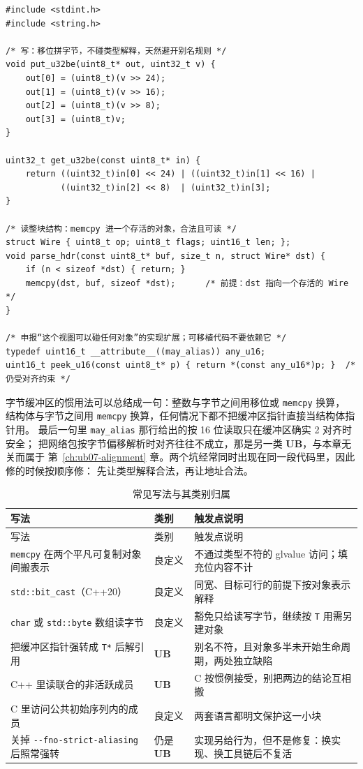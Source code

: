 \documentclass[12pt,a4paper,fontset=fandol]{ctexbook}
\newcommand{\cpp}[1]{C++#1}
\newcommand{\Tp}[1]{\texttt{#1}}
\newcommand{\Opt}[1]{\texttt{-\/-#1}}
\newcommand{\Bk}{\discretionary{}{}{}}
\newcommand{\Lang}[1]{\textsf{#1}}
\newcommand{\CL}{\Lang{C}}
\newcommand{\CPP}{\Lang{C++}}
\newcommand{\UB}{\textbf{\textsf{UB}}}
\newcommand{\Hdr}[1]{\texttt{<#1>}}
\begin{document}
\begin{lstlisting}[style=cstyle, caption={\Hdr{cstdint} 与字节缓冲区：把整数写成字节再解析}]
#include <stdint.h>
#include <string.h>

/* 写：移位拼字节，不碰类型解释，天然避开别名规则 */
void put_u32be(uint8_t* out, uint32_t v) {
    out[0] = (uint8_t)(v >> 24);
    out[1] = (uint8_t)(v >> 16);
    out[2] = (uint8_t)(v >> 8);
    out[3] = (uint8_t)v;
}

uint32_t get_u32be(const uint8_t* in) {
    return ((uint32_t)in[0] << 24) | ((uint32_t)in[1] << 16) |
           ((uint32_t)in[2] << 8)  | (uint32_t)in[3];
}

/* 读整块结构：memcpy 进一个存活的对象，合法且可读 */
struct Wire { uint8_t op; uint8_t flags; uint16_t len; };
void parse_hdr(const uint8_t* buf, size_t n, struct Wire* dst) {
    if (n < sizeof *dst) { return; }
    memcpy(dst, buf, sizeof *dst);      /* 前提：dst 指向一个存活的 Wire */
}

/* 申报“这个视图可以碰任何对象”的实现扩展；可移植代码不要依赖它 */
typedef uint16_t __attribute__((may_alias)) any_u16;
uint16_t peek_u16(const uint8_t* p) { return *(const any_u16*)p; }  /* 仍受对齐约束 */
\end{lstlisting}

字节缓冲区的惯用法可以总结成一句：整数与字节之间用移位或 \Tp{memcpy} 换算，
结构体与字节之间用 \Tp{memcpy} 换算，任何情况下都不把缓冲区指针直接当结构体指针用。
最后一句里 \Tp{may\_alias} 那行给出的按 16 位读取只在缓冲区确实 2 对齐时安全；
把网络包按字节偏移解析时对齐往往不成立，那是另一类 \UB{}，与本章无关而属于
第~\ref{ch:ub07-alignment} 章。两个坑经常同时出现在同一段代码里，因此修的时候按顺序修：
先让类型解释合法，再让地址合法。

\begin{longtable}{@{}>{\raggedright\arraybackslash}p{} >{\raggedright\arraybackslash}p{} >{\raggedright\arraybackslash}p{}@{}}
\caption{常见写法与其类别归属}\label{tab:ub06-classes}\\
\toprule
写法 & 类别 & 触发点说明 \\
\midrule
\endfirsthead
\toprule
写法 & 类别 & 触发点说明 \\
\midrule
\endhead
\bottomrule
\endfoot
\Tp{memcpy} 在两个平凡可复制对象间搬表示 & 良定义 & 不通过类型不符的 glvalue 访问；填充位内容不计 \\
\Tp{std::bit{\Bk}\_cast}（\cpp{20}） & 良定义 & 同宽、目标可行的前提下按对象表示解释 \\
\Tp{char} 或 \Tp{std::byte} 数组读字节 & 良定义 & 豁免只给读写字节，继续按 \Tp{T} 用需另建对象 \\
把缓冲区指针强转成 \Tp{T*} 后解引用 & \UB{} & 别名不符，且对象多半未开始生命周期，两处独立缺陷 \\
\CPP{} 里读联合的非活跃成员 & \UB{} & \CL{} 按惯例接受，别把两边的结论互相搬 \\
\CL{} 里访问公共初始序列内的成员 & 良定义 & 两套语言都明文保护这一小块 \\
关掉 \Opt{fno{\Bk}-strict{\Bk}-aliasing} 后照常强转 & 仍是 \UB{} & 实现另给行为，但不是修复：换实现、换工具链后不复活 \\
\end{longtable}
\end{document}
